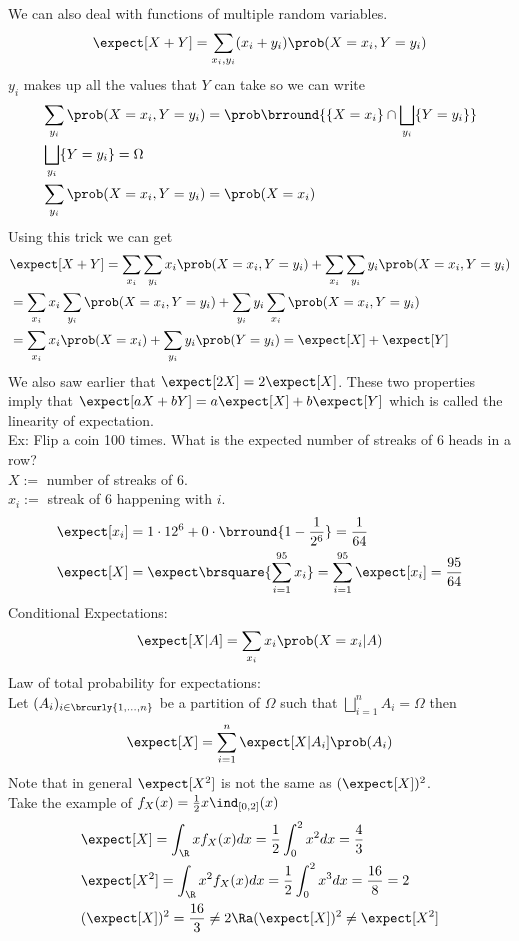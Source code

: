 We can also deal with functions of multiple random variables.\\
\[\expect[X+Y]=\sum_{x_i,y_i}(x_i+y_i)\prob(X=x_i,Y=y_i)\]
$y_i$ makes up all the values that $Y$ can take so we can write
\begin{align*}
    &\sum_{y_i}\prob(X=x_i,Y=y_i)=\prob\brround{\{X=x_i\}\cap\bigsqcup_{y_i}\{Y=y_i\}}\\
    &\bigsqcup_{y_i}\{Y=y_i\}=\Omega\\
    &\sum_{y_i}\prob(X=x_i,Y=y_i)=\prob(X=x_i)
\end{align*}
Using this trick we can get
\begin{align*}
    &\expect[X+Y]=\sum_{x_i}\sum_{y_i}x_i\prob(X=x_i,Y=y_i)+\sum_{x_i}\sum_{y_i}y_i\prob(X=x_i,Y=y_i)\\
    &=\sum_{x_i}x_i\sum_{y_i}\prob(X=x_i,Y=y_i)+\sum_{y_i}y_i\sum_{x_i}\prob(X=x_i,Y=y_i)\\
    &=\sum_{x_i}x_i\prob(X=x_i)+\sum_{y_i}y_i\prob(Y=y_i)=\expect[X]+\expect[Y]
\end{align*}
We also saw earlier that $\expect[2X]=2\expect[X]$. These two properties imply that $\expect[aX+bY]=a\expect[X]+b\expect[Y]$ which is called the linearity of expectation.\\
Ex: Flip a coin 100 times. What is the expected number of streaks of 6 heads in a row?\\
$X:=$ number of streaks of 6.\\ 
$x_i:=$ streak of 6 happening with $i$.
\begin{align*}
    &\expect[x_i]=1\cdot{1}{2^6}+0\cdot\brround{1-\frac{1}{2^6}}=\frac{1}{64}\\
    &\expect[X]=\expect\brsquare{\sum_{i=1}^{95}x_i}=\sum_{i=1}^{95}\expect[x_i]=\frac{95}{64}
\end{align*}
Conditional Expectations:\\
\[\expect[X|A]=\sum_{x_i}x_i\prob(X=x_i|A)\]
Law of total probability for expectations:\\
Let $(A_i)_{i\in\brcurly{1,\ldots,n}}$ be a partition of $\Omega$ such that $\bigsqcup\limits_{i=1}^n A_i=\Omega$ then
\[\expect[X]=\sum_{i=1}^n\expect[X|A_i]\prob(A_i)\]
Note that in general $\expect[X^2]$ is not the same as $(\expect[X])^2$.\\
Take the example of $f_X(x)=\frac{1}{2}x\ind_{[0,2]}(x)$
\begin{align*}
    &\expect[X]=\int_\R xf_X(x)dx=\frac{1}{2}\int_0^2x^2dx=\frac{4}{3}\\
    &\expect[X^2]=\int_\R x^2f_X(x)dx=\frac{1}{2}\int_0^2x^3dx=\frac{16}{8}=2\\
    &(\expect[X])^2=\frac{16}{3}\neq2\Ra (\expect[X])^2\neq\expect[X^2]
\end{align*}

